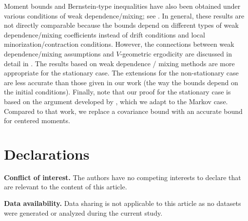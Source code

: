 \documentclass[sn-mathphys,Numbered]{sn-jnl}%
\begin{document}

Moment bounds and Bernstein-type inequalities have also been obtained under various conditions of weak dependence/mixing; see \cite{doukhan:louhichi:1999,doukhan2007probability,merlevede2011bernstein}. In general, these results are not directly comparable because the bounds depend on different types of weak dependence/mixing coefficients instead of drift conditions and local minorization/contraction conditions. However, the connections between weak dependence/mixing assumptions and $V$-geometric ergodicity are discussed in detail in \cite{adamczak2015exponential}. The results based on weak dependence / mixing methods are more appropriate for the stationary case. The extensions for the non-stationary case are less accurate than those given in our work (the way the bounds depend on the initial conditions). Finally, note that our proof for the stationary case is based on the argument developed by \cite{doukhan2007probability}, which we adapt to the Markov case. Compared to that work, we replace a covariance bound with an accurate bound for centered moments.





\section*{Declarations}

\textbf{Conflict of interest. } The authors have no competing interests to declare that are relevant to the content of this article.

\noindent\textbf{Data availability. } Data sharing is not applicable to this article as no datasets were generated or analyzed during the current study.

\newpage

\end{document}
